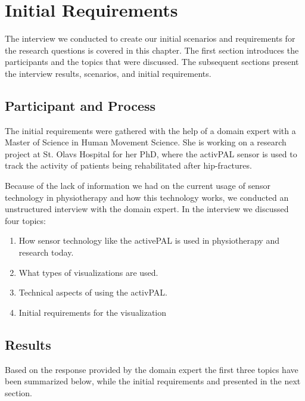 \chapter{Initial Requirements}
\label{ch:initialRequirements}
The interview we conducted to create our initial scenarios and requirements for the research questions is covered in this chapter. The first section introduces the participants and the topics that were discussed. The subsequent sections present the interview results, scenarios, and initial requirements.

\section{Participant and Process}
\label{sec:reqGathering}
The initial requirements were gathered with the help of a domain expert with a Master of Science in Human Movement Science. She is working on a research project at St. Olavs Hospital for her PhD, where the activPAL sensor is used to track the activity of patients being rehabilitated after hip-fractures.

Because of the lack of information we had on the current usage of sensor technology in physiotherapy and how this technology works, we conducted an unstructured interview with the domain expert. In the interview we discussed four topics: 

\begin{enumerate}
  \item How sensor technology like the activePAL is used in physiotherapy and research today.
  \item What types of visualizations are used.
  \item Technical aspects of using the activPAL.
  \item Initial requirements for the visualization
\end{enumerate}

\section{Results}
Based on the response provided by the domain expert the first three topics have been summarized below, while the initial requirements and presented in the next section.

